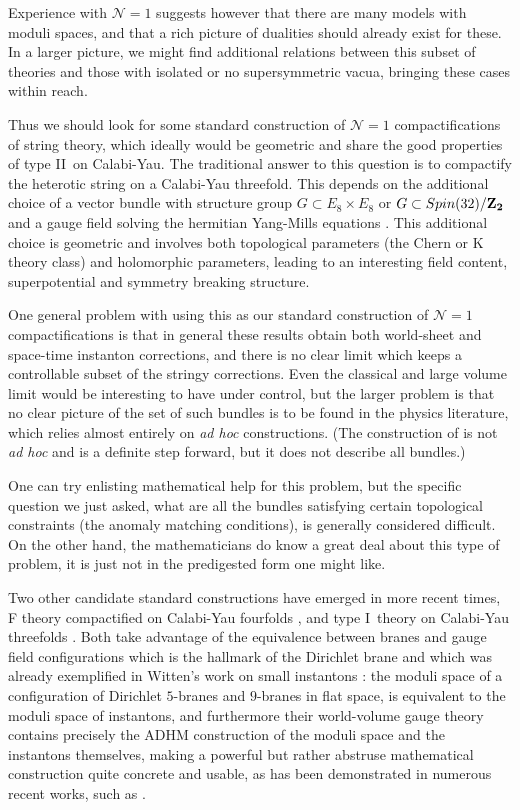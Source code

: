 \documentclass[a4paper,12pt]{amsart}
\numberwithin{equation}{section}
\theoremstyle{plain}
\theoremstyle{definition}
\def\Bbb#1{{\fam\black\relax#1}}
\def\Bbb{\bf}
\def\cal{\mathcal}
\def \I {I}
\def \II {II}
\def\BZ{\Bbb{Z}}
\def\CN{{\cal N}}
\begin{document}
Experience with $\CN=1$ suggests however that there are many models
with moduli spaces, and that a rich picture of dualities should
already exist for these.  In a larger picture, we might find
additional relations between this subset of theories and those with
isolated or no supersymmetric vacua, bringing these cases within reach.

Thus we should look for some standard construction of $\CN=1$
compactifications of string theory, which ideally would be geometric
and share the good properties of type \II\ on Calabi-Yau.  The
traditional answer to this question is to compactify the heterotic
string on a Calabi-Yau threefold.  This depends on the additional
choice of a vector bundle with structure group $G\subset E_8\times E_8$
or $G\subset Spin(32)/\BZ_2$ and a gauge field solving the hermitian
Yang-Mills equations \cite{GSW}.  This additional choice is geometric and
involves both topological parameters (the Chern or K theory class) and
holomorphic parameters, leading to an interesting field content,
superpotential and symmetry breaking structure.

One general problem with using this as our standard construction of
$\CN=1$ compactifications is that in general these results obtain both
world-sheet and space-time instanton corrections, and there is no
clear limit which keeps a controllable subset of the stringy
corrections.  Even the classical and large volume limit would be
interesting to have under control, but the larger problem is that no
clear picture of the set of such bundles is to be found in the physics
literature, which relies almost entirely on {\it ad hoc} constructions.
(The construction of \cite{FMW} is not {\it ad hoc} and is a definite
step forward, but it does not describe all bundles.)

One can try enlisting mathematical help for this problem, but the
specific question we just asked, what are all the bundles satisfying
certain topological constraints (the anomaly matching conditions), is
generally considered difficult.  On the other hand, the mathematicians
do know a great deal about this type of problem, it is just not in the
predigested form one might like.

Two other candidate standard constructions have emerged in more recent
times, F theory compactified on Calabi-Yau fourfolds \cite{Vafa}, and
type \I\ theory on Calabi-Yau threefolds \cite{Sagnotti}.  Both
take advantage of the equivalence between branes and gauge
field configurations which is the hallmark of the Dirichlet brane and
which was already exemplified in Witten's work on small instantons
\cite{Witten}: the moduli space of a configuration of Dirichlet
$5$-branes and $9$-branes in flat space, is equivalent to the moduli
space of instantons, and furthermore their world-volume gauge theory
contains precisely the ADHM construction of the moduli space and the
instantons themselves, making a powerful but rather abstruse
mathematical construction quite concrete and usable, as has been
demonstrated in numerous recent works, such as \cite{Dorey}.
\end{document}

